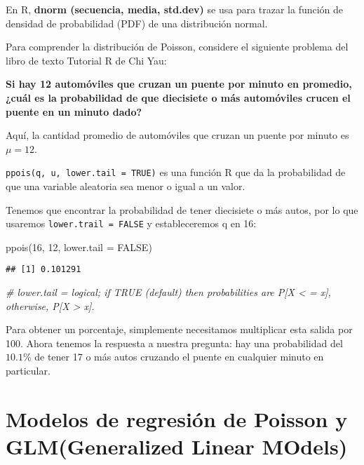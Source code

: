 \documentclass[
]{book}
\newenvironment{Shaded}{\begin{snugshade}}{\end{snugshade}}
\newcommand{\AttributeTok}[1]{\textcolor[rgb]{0.77,0.63,0.00}{#1}}
\newcommand{\CommentTok}[1]{\textcolor[rgb]{0.56,0.35,0.01}{\textit{#1}}}
\newcommand{\ConstantTok}[1]{\textcolor[rgb]{0.00,0.00,0.00}{#1}}
\newcommand{\DecValTok}[1]{\textcolor[rgb]{0.00,0.00,0.81}{#1}}
\newcommand{\FunctionTok}[1]{\textcolor[rgb]{0.00,0.00,0.00}{#1}}
\newcommand{\NormalTok}[1]{#1}
\begin{document}
En R, \textbf{dnorm (secuencia, media, std.dev)} se usa para trazar la función de densidad de probabilidad (PDF) de una distribución normal.

Para comprender la distribución de Poisson, considere el siguiente problema del libro de texto Tutorial R de Chi Yau:

\textbf{Si hay 12 automóviles que cruzan un puente por minuto en promedio, ¿cuál es la probabilidad de que diecisiete o más automóviles crucen el puente en un minuto dado?}

Aquí, la cantidad promedio de automóviles que cruzan un puente por minuto es \(\mu=12\).

\texttt{ppois(q,\ u,\ lower.tail\ =\ TRUE)} es una función R que da la probabilidad de que una variable aleatoria sea menor o igual a un valor.

Tenemos que encontrar la probabilidad de tener diecisiete o más autos, por lo que usaremos \texttt{lower.trail\ =\ FALSE} y estableceremos q en 16:

\begin{Shaded}
\begin{Highlighting}[]
\FunctionTok{ppois}\NormalTok{(}\DecValTok{16}\NormalTok{, }\DecValTok{12}\NormalTok{, }\AttributeTok{lower.tail =} \ConstantTok{FALSE}\NormalTok{)}
\end{Highlighting}
\end{Shaded}

\begin{verbatim}
## [1] 0.101291
\end{verbatim}

\begin{Shaded}
\begin{Highlighting}[]
\CommentTok{\# lower.tail = logical; if TRUE (default) then probabilities are P[X \textless{} = x], otherwise, P[X \textgreater{} x].}
\end{Highlighting}
\end{Shaded}

Para obtener un porcentaje, simplemente necesitamos multiplicar esta salida por 100. Ahora tenemos la respuesta a nuestra pregunta: hay una probabilidad del \(10.1\%\) de tener 17 o más autos cruzando el puente en cualquier minuto en particular.

\hypertarget{modelos-de-regresiuxf3n-de-poisson-y-glmgeneralized-linear-models}{%
\section{Modelos de regresión de Poisson y GLM(Generalized Linear MOdels)}\label{modelos-de-regresiuxf3n-de-poisson-y-glmgeneralized-linear-models}}
\end{document}
